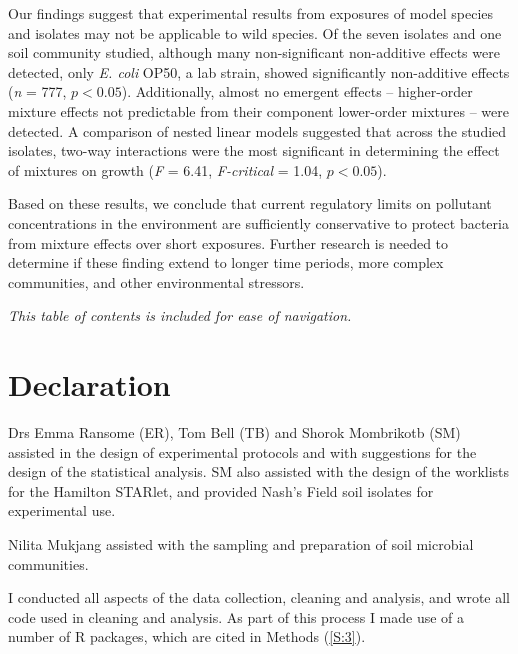 \documentclass[10pt]{article}
\begin{document}
Our findings suggest that experimental results from exposures of model species and isolates may not be applicable to wild species. Of the seven isolates and one soil community studied, although many non-significant non-additive effects were detected, only \textit{E. coli} OP50, a lab strain, showed significantly non-additive effects (\textit{n} = 777, $p < 0.05$). Additionally, almost no emergent effects -- higher-order mixture effects not predictable from their component lower-order mixtures -- were detected. A comparison of nested linear models suggested that across the studied isolates, two-way interactions were the most significant in determining the effect of mixtures on growth (\textit{F} = 6.41, \textit{F-critical} = 1.04, $p < 0.05$).  

Based on these results, we conclude that current regulatory limits on pollutant concentrations in the environment are sufficiently conservative to protect bacteria from mixture effects over short exposures. Further research is needed to determine if these finding extend to longer time periods, more complex communities, and other environmental stressors.

\newpage

\begin{spacing}{0.05}
\tableofcontents
\end{spacing}
\vspace{0.5cm}
\textit{This table of contents is included for ease of navigation.}

\newpage

\section*{Declaration} 

Drs Emma Ransome (ER), Tom Bell (TB) and Shorok Mombrikotb (SM) assisted in the design of experimental protocols and with suggestions for the design of the statistical analysis. SM also assisted with the design of the worklists for the Hamilton STARlet, and provided Nash's Field soil isolates for experimental use.

Nilita Mukjang assisted with the sampling and preparation of soil microbial communities.

I conducted all aspects of the data collection, cleaning and analysis, and wrote all code used in cleaning and analysis. As part of this process I made use of a number of R packages, which are cited in Methods (\cref{S:3}).

\linenumbers
\end{document}
